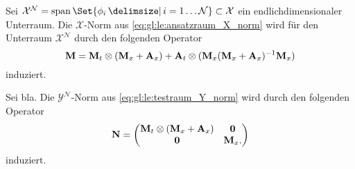 \begin{Lemma}
    Sei $\mathcal{X}^{\mathcal{N}} = \spn\Set{ \phi_{i} \given i = 1 \dots \mathcal N } \subset \mathcal X$ ein endlichdimensionaler Unterraum.
    Die $\mathcal X$-Norm aus \eqref{eq:gl:le:ansatzraum_X_norm}
    wird für den Unterraum $\mathcal{X}^{\mathcal N}$ durch den folgenden Operator
    \begin{equation}
        \mathbf{M} = \mathbf{M}_{t} \otimes (\mathbf{M}_{x} + \mathbf{A}_{x}) + \mathbf{A}_{t} \otimes (\mathbf{M}_{x} (\mathbf{M}_{x} + \mathbf{A}_{x})^{-1} \mathbf{M}_{x})
    \end{equation}
    induziert.
\end{Lemma}

\begin{Lemma}
    Sei bla.
    Die $\mathcal{Y}^{\mathcal N}$-Norm aus \eqref{eq:gl:le:testraum_Y_norm} wird durch den folgenden Operator
    \begin{equation}
        \mathbf{N} = \begin{pmatrix}
            \mathbf{M}_{t} \otimes (\mathbf{M}_{x} + \mathbf{A}_{x}) & \mathbf{0} \\
            \mathbf{0} & \mathbf{M}_{x}.
        \end{pmatrix}
    \end{equation}
    induziert.
\end{Lemma}


